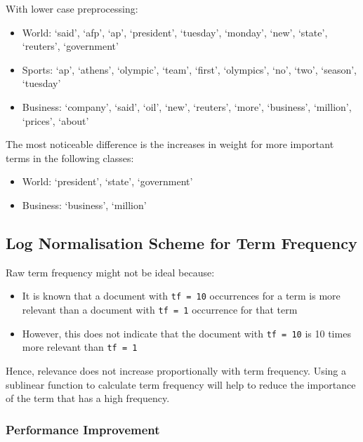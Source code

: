 \documentclass[11pt]{article}
\providecommand{\tightlist}{%
      \setlength{\itemsep}{0pt}\setlength{\parskip}{0pt}}
\begin{document}
With lower case preprocessing:

\begin{itemize}
\tightlist
\item
  World: `said', `afp', `ap', `president', `tuesday', `monday', `new',
  `state', `reuters', `government'
\item
  Sports: `ap', `athens', `olympic', `team', `first', `olympics', `no',
  `two', `season', `tuesday'
\item
  Business: `company', `said', `oil', `new', `reuters', `more',
  `business', `million', `prices', `about'
\end{itemize}

The most noticeable difference is the increases in weight for more
important terms in the following classes:

\begin{itemize}
\tightlist
\item
  World: `president', `state', `government'
\item
  Business: `business', `million'
\end{itemize}

\hypertarget{log-normalisation-scheme-for-term-frequency}{%
\subsection{Log Normalisation Scheme for Term
Frequency}\label{log-normalisation-scheme-for-term-frequency}}

Raw term frequency might not be ideal because:

\begin{itemize}
\tightlist
\item
  It is known that a document with \texttt{tf\ =\ 10} occurrences for a
  term is more relevant than a document with \texttt{tf\ =\ 1}
  occurrence for that term
\item
  However, this does not indicate that the document with
  \texttt{tf\ =\ 10} is 10 times more relevant than \texttt{tf\ =\ 1}
\end{itemize}

Hence, relevance does not increase proportionally with term frequency.
Using a sublinear function to calculate term frequency will help to
reduce the importance of the term that has a high frequency.

\hypertarget{performance-improvement-1}{%
\subsubsection{Performance
Improvement}\label{performance-improvement-1}}
\end{document}
